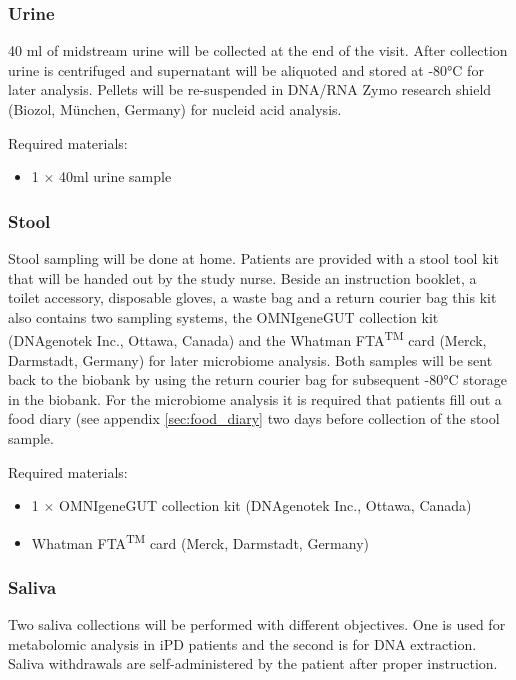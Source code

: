 \subsubsection{Urine}
\label{biosamples:urine}
40 ml of midstream urine will be collected at the end of the visit. After collection urine is centrifuged and supernatant will be aliquoted and stored at -80°C for later analysis. Pellets will be re-suspended in DNA/RNA Zymo research shield (Biozol, München, Germany) for  nucleid acid analysis.

\noindent Required materials:
\begin{itemize}
  \item 1 $\times$ 40ml urine sample
\end{itemize}

\subsubsection{Stool}
Stool sampling will be done at home. Patients are provided with a stool tool kit that will be handed out by the study nurse. Beside an instruction booklet, a toilet accessory, disposable gloves, a waste bag and a return courier bag this kit also contains two sampling systems, the OMNIgeneGUT\regd{} collection kit (DNAgenotek Inc., Ottawa, Canada) and the Whatman FTA\textsuperscript{TM} card (Merck, Darmstadt, Germany) for later microbiome analysis. Both samples will be sent back to the biobank by using the return courier bag for subsequent -80°C storage in the biobank. For the microbiome analysis it is required that patients fill out a food diary (see appendix \ref{sec:food_diary} two days before collection of the stool sample.

\noindent Required materials:
\begin{itemize}
  \item 1 $\times$ OMNIgeneGUT\regd{} collection kit
        (DNAgenotek Inc., Ottawa, Canada)
  \item Whatman FTA\textsuperscript{TM} card (Merck, Darmstadt, Germany)
\end{itemize}

\subsubsection{Saliva}
\label{biosamples:saliva}
Two saliva collections will be performed with different objectives. One is used for metabolomic analysis in \ac{iPD} patients and the second is for DNA extraction. Saliva withdrawals are self-administered by the patient after proper instruction.

